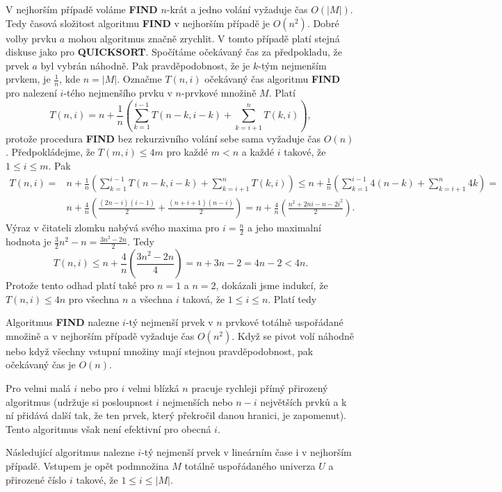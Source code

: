 \documentclass[a4paper,12pt]{article}
\begin{document}
V nejhorším případě 
voláme {\bf FIND} $n$-krát a jedno volání vyžaduje čas $
O(|M|)$.  
Tedy časová složitost algoritmu 
{\bf FIND} v nejhorším případě je $O(n^2)$.  Dobré volby 
prvku $a$ mohou algoritmus značně zrychlit.  V tomto 
případě platí stejná 
diskuse jako pro {\bf QUICKSORT}.  Spočítáme očekávaný čas 
za předpokladu, že  
pr\-vek $a$ byl vybrán náhodně.  Pak pravděpodobnost, že je 
$k$-tým nejmenším prvkem, je $\frac 1n$, kde $n=|M|$.  Označme $
T(n,i)$ 
očekávaný čas algoritmu {\bf FIND} pro nalezení $i$-tého nejmenšího 
prvku v $n$-prvkové množině $M$.  Platí 
$$T(n,i)=n+\frac 1n(\sum_{k=1}^{i-1}T(n-k,i-k)+\sum_{k=i+1}^nT(k,
i)),$$
protože procedura {\bf FIND} bez rekurzivního volání sebe sama 
vyžaduje čas $O(n)$. Předpoklá\-dej\-me, že $T(m,i)
\le 4m$ 
pro každé $m<n$ a každé $i$ takové, že $1\le i\le 
m$. Pak 
\begin{align*} T(n,i)=&n+\frac 1n(\sum_{k=1}^{i-1}T(n-k,i-k)+\sum_{k=i+
1}^nT(k,i))\le n+\frac 1n(\sum_{k=1}^{i-1}4(n-k)+\sum_{k=i+1}^n4k
)=\\
&n+\frac 4n(\frac {(2n-i)(i-1)}2+\frac {(n+i+1)(n-i)}2)=n+\frac 4
n(\frac {n^2+2ni-n-2i^2}2).\end{align*}
Výraz v čitateli zlomku nabývá svého maxima pro 
$i=\frac n2$ a jeho maximalní hodnota je 
$\frac 32n^2-n=\frac {3n^2-2n}2$. Tedy
$$T(n,i)\le n+\frac 4n(\frac {3n^2-2n}4)=n+3n-2=4n-2<4n.$$
Protože tento odhad platí také pro $n=1$ a $n=2$, dokázali 
jsme indukcí, že $T(n,i)\le 4n$ pro všechna $n$ a všechna $
i$ 
taková, že $1\le i\le n$. Platí tedy 

\begin{veta}Algoritmus {\bf FIND} nalezne $i$-tý nejmenší 
prvek v $n$ prv\-kové totálně uspořádané mno\-ži\-ně a v nejhorším 
případě vyža\-du\-je čas $O(n^2)$. Když se pivot volí 
náhodně nebo když všechny vstupní množiny mají stejnou 
pravděpodobnost, pak očekávaný čas je $O(n)$.
\end{veta}

Pro velmi malá $i$ nebo pro $i$ velmi blízká $n$ 
pracuje rychleji přímý přirozený algoritmus (udržuje si 
posloupnost $i$ nejmen\-ších nebo $n-i$ největších prvků 
a k ní přidává další tak, že ten prvek, který pře\-kročil 
danou hranici, je 
zapomenut). Tento algoritmus však není 
efektivní pro obecná $i$. 

Následující algoritmus nalezne $i$-tý nejmenší 
prvek v lineárním čase i v nejhorším případě.  Vstupem 
je opět podmnožina $M$ totálně 
uspořádaného univerza $U$ a přirozené číslo $i$ takové, že 
$1\le i\le |M|$.  
\end{document}
